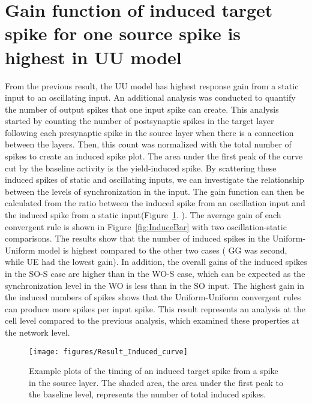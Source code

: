 \section[The Number of Induced Spikes]{Gain function of induced target spike for one source spike is highest in UU model }
 From the previous result, the UU model has highest response gain from a static input to an oscillating input. An additional analysis was conducted to quantify the number of output spikes that one input spike can create. This analysis started by counting the number of postsynaptic spikes in the target layer following each presynaptic spike in the source layer when there is a connection between the layers. Then, this count was normalized with the total number of spikes to create an induced spike plot. The area under the first peak of the curve cut by the baseline activity is the yield-induced spike. By scattering these induced spikes of static and oscillating inputs, we can investigate the relationship between the levels of synchronization in the input. The gain function can then be calculated from the ratio between the induced spike from an oscillation input and the induced spike from a static input(Figure~\ref{fig:InduceCurve}. ). The average gain of each convergent rule is shown in Figure~\ref{fig:InduceBar} with two oscillation-static comparisons. The results show that the number of induced spikes in the Uniform-Uniform model is highest compared to the other two cases ( GG was second, while UE had the lowest gain). In addition, the overall gains of the induced spikes in the SO-S case are higher than in the WO-S case, which can be expected as the synchronization level in the WO is less than in the SO input. The highest gain in the induced numbers of spikes shows that the Uniform-Uniform convergent rules can produce more spikes per input spike. This result represents an analysis at the cell level compared to the previous analysis, which examined these properties at the network level. 



\begin{figure}[!h]
	\centering
	\texttt{[image: figures/Result\_Induced\_curve]}
	\caption[Example plots of the timing of an induced target spike]{Example plots of the timing of an induced target spike from a spike in the source layer. The shaded area, the area under the first peak to the baseline level, represents the number of total induced spikes.}
	\label{fig:InduceCurve}
\end{figure}


